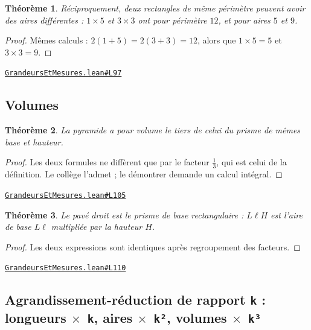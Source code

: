 \documentclass[11pt,a4paper]{article}
\theoremstyle{definition}
\theoremstyle{plain}
\newtheorem{theoreme}{Théorème}
\newcommand{\source}[2]{\par\smallskip\noindent\hfill{\footnotesize\href{#1}{\texttt{#2}}}\par\smallskip}
\begin{document}
\begin{theoreme}
Réciproquement, deux rectangles de même périmètre peuvent avoir des aires différentes :
$1 \times 5$ et $3 \times 3$ ont pour périmètre $12$, et pour aires $5$ et $9$.
\end{theoreme}

\begin{proof}
Mêmes calculs : $2(1+5) = 2(3+3) = 12$, alors que $1 \times 5 = 5$ et $3 \times 3 = 9$.
\end{proof}
\source{https://github.com/Commutator-IO/learn-lean/blob/main/cours/01-college/04-grandeurs-et-mesures/GrandeursEtMesures.lean\#L97}{GrandeursEtMesures.lean\#L97}

\subsection{Volumes}

\begin{theoreme}
La pyramide a pour volume le tiers de celui du prisme de mêmes base et hauteur.
\end{theoreme}

\begin{proof}
Les deux formules ne diffèrent que par le facteur $\tfrac13$, qui est celui de la
définition. Le collège l'admet ; le démontrer demande un calcul intégral.
\end{proof}
\source{https://github.com/Commutator-IO/learn-lean/blob/main/cours/01-college/04-grandeurs-et-mesures/GrandeursEtMesures.lean\#L105}{GrandeursEtMesures.lean\#L105}

\begin{theoreme}
Le pavé droit est le prisme de base rectangulaire : $L\ell H$ est l'aire de base
$L\ell$ multipliée par la hauteur $H$.
\end{theoreme}

\begin{proof}
Les deux expressions sont identiques après regroupement des facteurs.
\end{proof}
\source{https://github.com/Commutator-IO/learn-lean/blob/main/cours/01-college/04-grandeurs-et-mesures/GrandeursEtMesures.lean\#L110}{GrandeursEtMesures.lean\#L110}

\subsection{Agrandissement-réduction de rapport \texttt{k} : longueurs \texttt{\(\times\) k}, aires \texttt{\(\times\) k²}, volumes \texttt{\(\times\) k³}}
\end{document}
